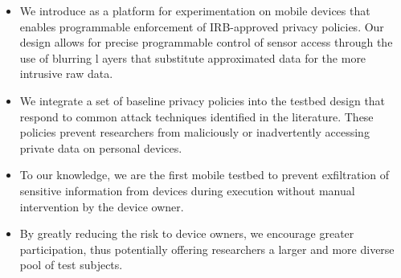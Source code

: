 \begin{itemize}\setlength\itemsep{0em}

\item We introduce \sysname as a platform for experimentation on 
mobile devices that enables programmable enforcement of 
IRB-approved privacy policies. Our design allows for precise 
programmable control of sensor access through the use of blurring l
ayers that substitute approximated data for the more intrusive raw data.


\item We integrate a set of baseline privacy policies into the testbed 
design that respond to common attack techniques identified in the 
literature. These policies prevent researchers from maliciously or 
inadvertently accessing private data on personal devices.



\item To our knowledge, we are the first mobile testbed to prevent 
exfiltration of sensitive information from devices during execution 
without manual intervention by the device owner. 

\item By greatly reducing the risk to device owners, we encourage 
greater participation, thus potentially offering researchers a larger and 
more diverse pool of test subjects.

\end{itemize}

